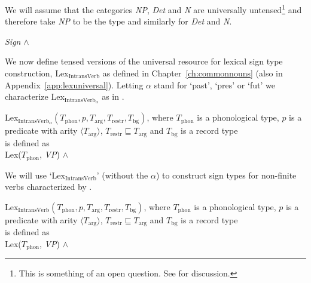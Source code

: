 We will assume that the categories \textit{NP}, \textit{Det} and
\textit{N} are universally untensed\footnote{This is something of an
  open question.  See \cite{Tonhauser2007} for discussion.} and
therefore take \textit{NP} to be the type \nexteg{} and similarly
for \textit{Det} and \textit{N}.
\begin{ex} 
\textit{Sign} \d{$\wedge$} 
\end{ex} 

We now define tensed versions of the universal resource for lexical
sign type construction, Lex$_{\mathrm{IntransVerb}}$ as defined in
Chapter~\ref{ch:commonnouns} (also in
Appendix~\ref{app:lexuniversal}). Letting $\alpha$ stand for `past',
`pres' or `fut' we characterize Lex$_{\mathrm{IntransVerb}_\alpha}$ as
in \nexteg{}.
\begin{ex} 
Lex$_{\mathrm{IntransVerb}_\alpha}(T_{\mathrm{phon}},p,T_{\mathrm{arg}},T_{\mathrm{restr}},T_{\mathrm{bg}})$,
where $T_{\mathrm{phon}}$ is a phonological type, $p$ is a predicate
  with arity $\langle T_{\mathrm{arg}}\rangle$,
  $T_{\mathrm{restr}}\sqsubseteq T_{\mathrm{arg}}$ and
  $T_{\mathrm{bg}}$ is a record type \\
is defined as \\
Lex($T_{\mathrm{phon}}$, \textit{VP}) \d{$\wedge$} 
\end{ex} 
We will use `Lex$_{\mathrm{IntransVerb}}$' (without the $\alpha$) to
construct sign types for non-finite verbs characterized by \nexteg{}.
\begin{ex} 
Lex$_{\mathrm{IntransVerb}}(T_{\mathrm{phon}},p,T_{\mathrm{arg}},T_{\mathrm{restr}},T_{\mathrm{bg}})$,
where $T_{\mathrm{phon}}$ is a phonological type, $p$ is a predicate
  with arity $\langle T_{\mathrm{arg}}\rangle$,
  $T_{\mathrm{restr}}\sqsubseteq T_{\mathrm{arg}}$ and
  $T_{\mathrm{bg}}$ is a record type \\
is defined as \\
Lex($T_{\mathrm{phon}}$, \textit{VP}) \d{$\wedge$} 
\end{ex}       

